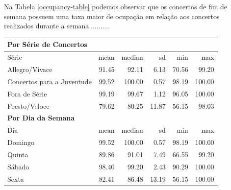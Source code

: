 \documentclass[a4paper, 12pt, openright, oneside, german, french, english, brazil]{abntex2}
\begin{document}
	
	
	Na Tabela \ref{occupancy-table} podemos observar que os concertos de fim de semana possuem uma taxa maior de ocupação em relação aos concertos realizados durante a semana...........
	
	\begin{table}[ht]
		{\begin{tabular}{lrrrrr}
				\hline
				\multicolumn{6}{l}{\textbf{Por Série de Concertos}} \\
				\hline
				Série & mean & median & sd & min & max \\ 
				\hline
				Allegro/Vivace & 91.45 & 92.11 & 6.13 & 70.56 & 99.20 \\ 
				Concertos para a Juventude & 99.52 & 100.00 & 0.57 & 98.19 & 100.00 \\
				Fora de Série & 99.19 & 99.67 & 1.12 & 96.05 & 100.00 \\
				Presto/Veloce & 79.62 & 80.25 & 11.87 & 56.15 & 98.03 \\
				\hline
				\multicolumn{6}{l}{\textbf{Por Dia da Semana}} \\
				\hline
				Dia  & mean & median & sd & min & max \\
				\hline
				Domingo & 99.52 & 100.00 & 0.57 & 98.19 & 100.00 \\ 
				Quinta & 89.86 & 91.01 & 7.49 & 66.55 & 99.20 \\ 
				Sábado & 98.40 & 99.20 & 2.43 & 90.29 & 100.00 \\ 
				Sexta & 82.41 & 86.48 & 13.19 & 56.15 & 100.00 \\ 
				\hline
			\end{tabular}
		}
		{}
	\end{table}
	
	





\end{document}
